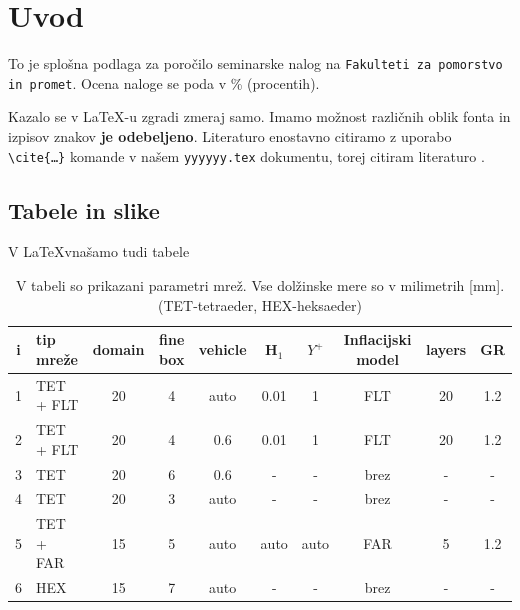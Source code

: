 \documentclass[11pt,a4]{article}
\begin{document}

\tableofcontents
\pagebreak


\section{Uvod}
To je splošna podlaga za poročilo seminarske nalog na \texttt{Fakulteti za pomorstvo in promet}. Ocena naloge se poda v \% (procentih).

Kazalo se v \LaTeX-u zgradi zmeraj samo. Imamo možnost različnih oblik fonta in izpisov znakov \textbf{je odebeljeno}. Literaturo enostavno citiramo z uporabo \texttt{\textbackslash cite\{\ldots\}} komande v našem  \texttt{yyyyyy.tex} dokumentu, torej citiram literaturo \cite{baker_1}. 

\subsection{Tabele in slike}
V \LaTeX vnašamo tudi tabele

\begin{table}[!htbp] 
	\caption{V tabeli so prikazani parametri mrež. Vse dolžinske mere so v milimetrih [mm]. (TET-tetraeder, HEX-heksaeder)}
	\vspace{2mm}
	\begin{center}
		{\small
			\begin{tabular}{c||l||c|c|c|c|c|c|c|c}\hline
				i & tip mreže & domain & fine box & vehicle & H$_1$  & $Y^+$ & Inflacijski model & layers & GR  \\ \hline \hline
				1 & TET + FLT & 20     & 4        & auto    & 0.01   & 1     & FLT               & 20     & 1.2 \\ \hline
				2 & TET + FLT & 20     & 4        & 0.6     & 0.01   & 1     & FLT               & 20     & 1.2 \\ \hline
				3 & TET       & 20     & 6        & 0.6     & -      & -     & brez              & -      & -   \\ \hline
				4 & TET       & 20     & 3        & auto    & -      & -     & brez              & -      & -   \\ \hline
				5 & TET + FAR & 15     & 5        & auto    & auto   & auto  & FAR               & 5      & 1.2 \\ \hline
				6 & HEX       & 15     & 7        & auto    & -      & -     & brez              & -      & -   \\ \hline
			\end{tabular}
		}
	\end{center}
	\label{tab:tabela_01}
\end{table}
\end{document}
